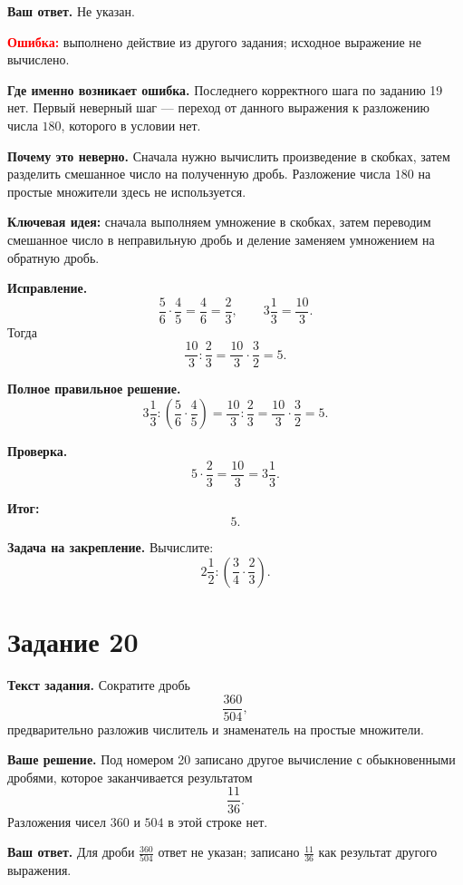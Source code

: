 \documentclass[12pt,a4paper]{article}
\begin{document}
\textbf{Ваш ответ.}
Не указан.

\textcolor{red}{\textbf{Ошибка:}} выполнено действие из другого задания; исходное выражение не вычислено.

\textbf{Где именно возникает ошибка.}
Последнего корректного шага по заданию 19 нет.
Первый неверный шаг --- переход от данного выражения к разложению числа $180$, которого в условии нет.

\textbf{Почему это неверно.}
Сначала нужно вычислить произведение в скобках, затем разделить смешанное число на полученную дробь.
Разложение числа $180$ на простые множители здесь не используется.

\textcolor{blue!60!black}{\textbf{Ключевая идея:}}
сначала выполняем умножение в скобках, затем переводим смешанное число в неправильную дробь
и деление заменяем умножением на обратную дробь.

\textbf{Исправление.}
\[
\frac56\cdot\frac45=\frac46=\frac23,
\qquad
3\frac13=\frac{10}{3}.
\]
Тогда
\[
\frac{10}{3}:\frac23
=\frac{10}{3}\cdot\frac32
=5.
\]

\textbf{Полное правильное решение.}
\[
3\frac13:\left(\frac56\cdot\frac45\right)
=\frac{10}{3}:\frac23
=\frac{10}{3}\cdot\frac32
=5.
\]

\textbf{Проверка.}
\[
5\cdot\frac23=\frac{10}{3}=3\frac13.
\]

\textcolor{teal!60!black}{\textbf{Итог:}}
\[
\boxed{5}.
\]

\textbf{Задача на закрепление.}
Вычислите:
\[
2\frac12:\left(\frac34\cdot\frac23\right).
\]

\newpage
{}
\label{task:20}
\section*{Задание 20}

\textbf{Текст задания.}
Сократите дробь
\[
\frac{360}{504},
\]
предварительно разложив числитель и знаменатель на простые множители.

\textbf{Ваше решение.}
Под номером 20 записано другое вычисление с обыкновенными дробями,
которое заканчивается результатом
\[
\frac{11}{36}.
\]
Разложения чисел $360$ и $504$ в этой строке нет.

\textbf{Ваш ответ.}
Для дроби $\frac{360}{504}$ ответ не указан; записано $\frac{11}{36}$ как результат другого выражения.
\end{document}
